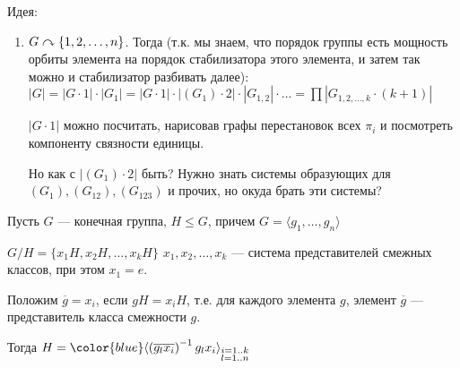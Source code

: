 Идея: 
\begin{enumerate}
    \item $G \curvearrowright \{1, 2, \ldots, n\}$. Тогда (т.к. мы знаем, что порядок группы есть мощность орбиты элемента на порядок стабилизатора этого элемента, и затем так можно и стабилизатор разбивать далее): $|G| = |G \cdot 1| \cdot |G_1| = |G\cdot 1| \cdot |(G_1)\cdot 2| \cdot |G_{1,2}| \cdot \ldots = \prod |G_{1,2,\ldots,k} \cdot (k+1)|$

        $|G\cdot 1|$ можно посчитать, нарисовав графы перестановок всех $\pi_i$ и посмотреть компоненту связности единицы.

	Но как с $|(G_1) \cdot 2|$ быть? Нужно знать системы образующих для $(G_1), (G_{12}), (G_{123})$ и прочих, но окуда брать эти системы?
\end{enumerate}
\begin{lemma}
    Пусть $G$ --- конечная группа,  $H \le G$, причем $G = \langle g_1, \ldots, g_n \rangle$

    $G / H = \{x_1H, x_2H,\ldots, x_kH\}$ $x_1, x_2,\ldots, x_k$ --- система представителей смежных классов, при этом $x_1 = e$.

    Положим $\overline{g} = x_i$, если  $gH = x_iH$, т.е. для каждого элемента $g$, элемент $\overline{g}$ --- представитель класса смежности $g$. 

    Тогда $H = {\color{blue}\langle \left(\overline{g_lx_i}\right)^{-1} g_l x_i \rangle}_{\substack{i = 1..k\\ l=1..n}}$
\end{lemma}
